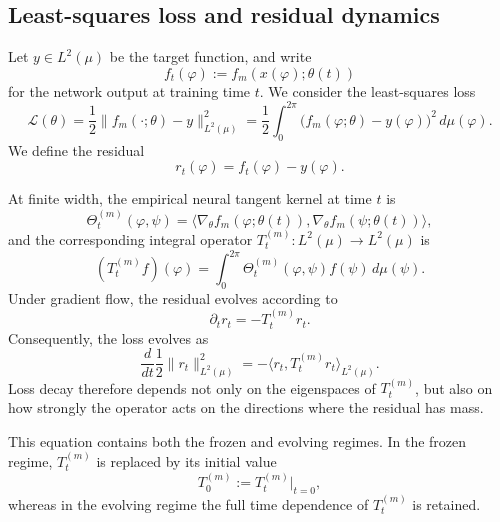 \subsection{Least-squares loss and residual dynamics}
\label{subsec:least-squares-loss-and-residual-dynamics}

Let \(y\in L^2(\mu)\) be the target function, and write
\[
	f_t(\varphi):=f_m(x(\varphi);\theta(t))
\]
for the network output at training time \(t\). We consider the least-squares loss
\begin{equation}
	\mathcal{L}(\theta)
	=
	\frac{1}{2}\|f_m(\cdot;\theta)-y\|_{L^2(\mu)}^2
	=
	\frac{1}{2}\int_0^{2\pi}\bigl(f_m(\varphi;\theta)-y(\varphi)\bigr)^2\,d\mu(\varphi).
	\label{eq:method-loss-functional}
\end{equation}
We define the residual
\begin{equation}
	r_t(\varphi)=f_t(\varphi)-y(\varphi).
	\label{eq:method-residual-function}
\end{equation}

At finite width, the empirical neural tangent kernel at time \(t\) is
\begin{equation}
	\Theta_t^{(m)}(\varphi,\psi)
	=
	\bigl\langle \nabla_\theta f_m(\varphi;\theta(t)),
	\nabla_\theta f_m(\psi;\theta(t))\bigr\rangle,
	\label{eq:method-empirical-ntk}
\end{equation}
and the corresponding integral operator \(T_t^{(m)}:L^2(\mu)\to L^2(\mu)\) is
\begin{equation}
	(T_t^{(m)}f)(\varphi)
	=
	\int_0^{2\pi}\Theta_t^{(m)}(\varphi,\psi)f(\psi)\,d\mu(\psi).
	\label{eq:method-time-dependent-kernel-operator}
\end{equation}
Under gradient flow, the residual evolves according to
\begin{equation}
	\partial_t r_t=-T_t^{(m)}r_t.
	\label{eq:method-exact-residual-flow}
\end{equation}
Consequently, the loss evolves as
\begin{equation}
	\frac{d}{dt}\frac12\|r_t\|_{L^2(\mu)}^2
	=
	-\langle r_t,T_t^{(m)}r_t\rangle_{L^2(\mu)}.
	\label{eq:method-loss-decay-identity}
\end{equation}
Loss decay therefore depends not only on the eigenspaces of \(T_t^{(m)}\), but
also on how strongly the operator acts on the directions where the residual has
mass.

This equation contains both the frozen and evolving regimes. In the frozen regime,
\(T_t^{(m)}\) is replaced by its initial value
\begin{equation}
	T_0^{(m)}:=T_t^{(m)}\big|_{t=0},
	\label{eq:method-frozen-operator}
\end{equation}
whereas in the evolving regime the full time dependence of \(T_t^{(m)}\) is retained.

